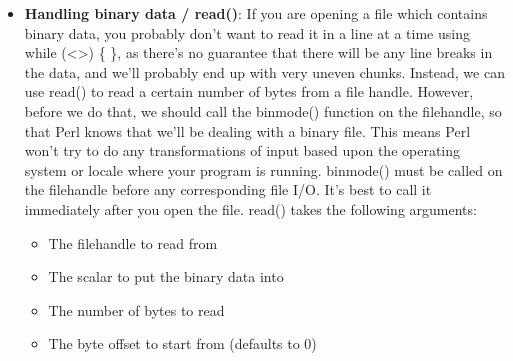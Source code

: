 \documentclass{report}
\begin{document}
\begin{itemize}
\begin{perlcode}
                flock(FILEHANDLE, LOCK_EX | LOCK_NB); # non-blocking exclusive lock
                flock(FILEHANDLE, LOCK_SH | LOCK_NB); # non-blocking shared lock
            \end{perlcode}
            \bigbreak \noindent 
            All attempts to get a non-blocking lock return immediately with either true for success (the lock was obtained) or false for failure (the lock was not obtained).
        \item \textbf{Handling binary data / read()}: If you are opening a file which contains binary data, you probably don’t want to read it in a line at a time using while (<>) \{ \}, as there’s no guarantee that there will be any line breaks in the data, and we’ll probably end up with very uneven chunks.
            \bigbreak \noindent 
            Instead, we can use read() to read a certain number of bytes from a file handle. However, before we do that, we should call the binmode() function on the filehandle, so that Perl knows that we’ll be dealing with a binary file. This means Perl won’t try to do any transformations of input based upon the operating system or locale where your program is running.
            \bigbreak \noindent 
            binmode() must be called on the filehandle before any corresponding file I/O. It’s best to call it immediately after you open the file.
            \bigbreak \noindent 
            read() takes the following arguments:
            \begin{itemize}
                \item The filehandle to read from
                \item The scalar to put the binary data into
                \item The number of bytes to read
                \item The byte offset to start from (defaults to 0)
            \end{itemize}

    \end{itemize}

    \pagebreak 
\end{document}
